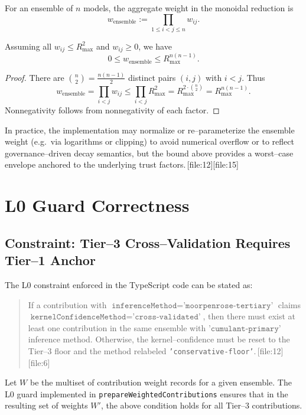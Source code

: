\documentclass[11pt]{article}
\begin{document}
For an ensemble of \(n\) models, the aggregate weight in the monoidal
reduction is
\[
  w_{\mathrm{ensemble}} := \prod_{1 \le i < j \le n} w_{ij}.
\]

\begin{proposition}
Assuming all \(w_{ij} \le R_{\max}^2\) and \(w_{ij} \ge 0\), we have
\[
  0 \le w_{\mathrm{ensemble}} \le R_{\max}^{n(n-1)}.
\]
\end{proposition}

\begin{proof}
There are \(\binom{n}{2} = \frac{n(n-1)}{2}\) distinct pairs \((i,j)\) with
\(i<j\). Thus
\[
  w_{\mathrm{ensemble}}
  = \prod_{i<j} w_{ij}
  \le \prod_{i<j} R_{\max}^2
  = R_{\max}^{2 \cdot \binom{n}{2}}
  = R_{\max}^{n(n-1)}.
\]
Nonnegativity follows from nonnegativity of each factor.
\end{proof}

In practice, the implementation may normalize or re--parameterize the
ensemble weight (e.g.\ via logarithms or clipping) to avoid numerical
overflow or to reflect governance--driven decay semantics, but the bound
above provides a worst--case envelope anchored to the underlying trust
factors.\,[file:12][file:15]

\section{L0 Guard Correctness}

\subsection{Constraint: Tier--3 Cross--Validation Requires Tier--1 Anchor}

The L0 constraint enforced in the TypeScript code can be stated as:

\begin{quote}
If a contribution with \(\texttt{inferenceMethod} = \texttt{'moorpenrose-tertiary'}\)
claims \(\texttt{kernelConfidenceMethod} = \texttt{'cross-validated'}\), then
there must exist at least one contribution in the same ensemble with
\(\texttt{'cumulant-primary'}\) inference method. Otherwise, the
kernel--confidence must be reset to the Tier--3 floor and the method relabeled
\texttt{'conservative-floor'}.\,[file:12][file:6]
\end{quote}

\begin{proposition}
Let \(W\) be the multiset of contribution weight records for a given ensemble.
The L0 guard implemented in \texttt{prepareWeightedContributions} ensures that
in the resulting set of weights \(W'\), the above condition holds for all
Tier--3 contributions.
\end{proposition}
\end{document}
